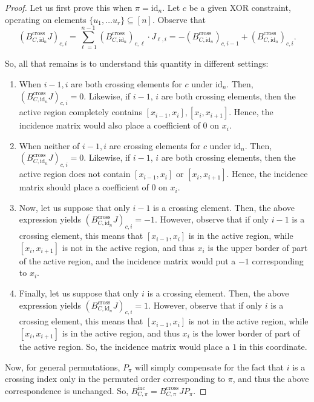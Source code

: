 \documentclass[11pt]{article}
\theoremstyle{definition}
\begin{document}
\begin{proof}
	Let us first prove this when $\pi = \mathrm{id}_n$. Let $c$ be a given XOR constraint, operating on elements $\{u_1, \dots u_r \} \subseteq [n]$. Observe that 
	\[
	(B^{\text{cross}}_{C, \mathrm{id}_n} J)_{c, i} = \sum_{\ell=  1}^{n-1} (B^{\text{cross}}_{C, \mathrm{id}_n})_{c, \ell} \cdot J_{\ell, i} = -(B^{\text{cross}}_{C, \mathrm{id}_n})_{c, i-1} + (B^{\text{cross}}_{C, \mathrm{id}_n})_{c, i}.
	\]
	
	So, all that remains is to understand this quantity in different settings:
	\begin{enumerate}
		\item When $i-1, i$ are both crossing elements for $c$ under $\mathrm{id}_n$. Then, $(B^{\text{cross}}_{C, \mathrm{id}_n} J)_{c, i} = 0$. Likewise, if $i-1$, $i$ are both crossing elements, then the active region completely contains $[x_{i-1}, x_i], [x_i, x_{i+1}]$. Hence, the incidence matrix would also place a coefficient of $0$ on $x_i$.
		\item When neither of $i-1, i$ are crossing elements for $c$ under $\mathrm{id}_n$. Then, $(B^{\text{cross}}_{C, \mathrm{id}_n} J)_{c, i} = 0$. Likewise, if $i-1$, $i$ are both crossing elements, then the active region does not contain $[x_{i-1}, x_i]$ or $[x_i, x_{i+1}]$. Hence, the incidence matrix should place a coefficient of $0$ on $x_i$.
		\item Now, let us suppose that only $i-1$ is a crossing element. Then, the above expression yields $(B^{\text{cross}}_{C, \mathrm{id}_n} J)_{c, i} = -1$. However, observe that if only $i-1$ is a crossing element, this means that $[x_{i-1}, x_i]$ is in the active region, while $[x_i, x_{i+1}]$ is not in the active region, and thus $x_i$ is the upper border of part of the active region, and the incidence matrix would put a $-1$ corresponding to $x_i$.
		\item Finally, let us suppose that only $i$ is a crossing element. Then, the above expression yields $(B^{\text{cross}}_{C, \mathrm{id}_n} J)_{c, i} = 1$. However, observe that if only $i$ is a crossing element, this means that $[x_{i-1}, x_i]$ is not in the active region, while $[x_i, x_{i+1}]$ is in the active region, and thus $x_i$ is the lower border of part of the active region. So, the incidence matrix would place a $1$ in this coordinate.
	\end{enumerate}
	
	Now, for general permutations, $P_{\pi}$ will simply compensate for the fact that $i$ is a crossing index only in the permuted order corresponding to $\pi$, and thus the above correspondence is unchanged. So, $B^{\text{inc}}_{C, \pi} = B^{\text{cross}}_{C, \pi} J P_{\pi}$.
\end{proof}
\end{document}
